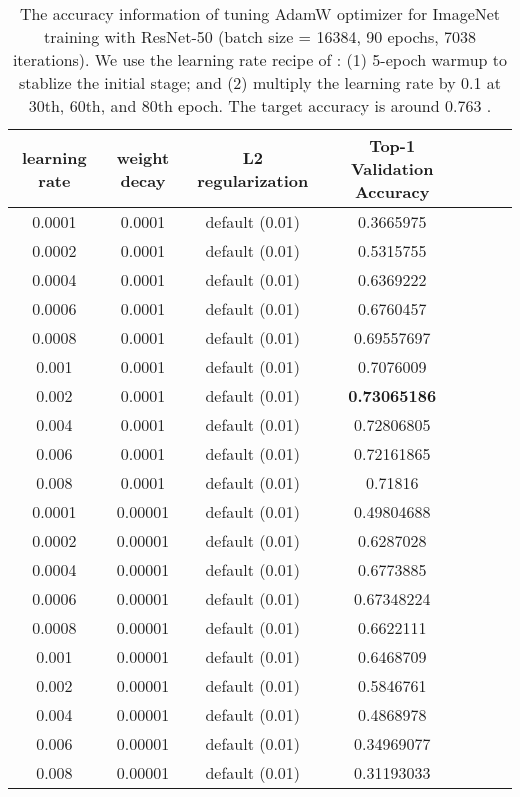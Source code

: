 \documentclass{article} \usepackage{iclr2020_conference,times}
\begin{document}
\begin{table}[ht]
\renewcommand{\arraystretch}{1.3}
\caption{The accuracy information of tuning AdamW optimizer for ImageNet training with ResNet-50 (batch size = 16384, 90 epochs, 7038 iterations). We use the learning rate recipe of \citep{goyal2017accurate}: (1) 5-epoch warmup to stablize the initial stage; and (2) multiply the learning rate by 0.1 at 30th, 60th, and 80th epoch. The target accuracy is around 0.763 \citep{goyal2017accurate}.}
\centering
\begin{tabular}{|c|c|c|c|c|c|c|}
\hline
learning rate & weight decay & L2 regularization & Top-1 Validation Accuracy \\
\hline
\hline
0.0001 & 0.0001 & default (0.01) & 0.3665975 \\
\hline
0.0002 & 0.0001 & default (0.01) & 0.5315755 \\
\hline
0.0004 & 0.0001 & default (0.01) & 0.6369222 \\
\hline
0.0006 & 0.0001 & default (0.01) & 0.6760457 \\
\hline
0.0008 & 0.0001 & default (0.01) & 0.69557697 \\
\hline
0.001 & 0.0001 & default (0.01) & 0.7076009 \\
\hline
0.002 & 0.0001 & default (0.01) & {\bf 0.73065186} \\
\hline
0.004 & 0.0001 & default (0.01) & 0.72806805 \\
\hline
0.006 & 0.0001 & default (0.01) & 0.72161865 \\
\hline
0.008 & 0.0001 & default (0.01) & 0.71816 \\
\hline
0.0001 & 0.00001 & default (0.01) & 0.49804688 \\
\hline
0.0002 & 0.00001 & default (0.01) & 0.6287028 \\
\hline
0.0004 & 0.00001 & default (0.01) & 0.6773885 \\
\hline
0.0006 & 0.00001 & default (0.01) & 0.67348224 \\
\hline
0.0008 & 0.00001 & default (0.01) & 0.6622111 \\
\hline
0.001 & 0.00001 & default (0.01) & 0.6468709 \\
\hline
0.002 & 0.00001 & default (0.01) & 0.5846761 \\
\hline
0.004 & 0.00001 & default (0.01) & 0.4868978 \\
\hline
0.006 & 0.00001 & default (0.01) & 0.34969077 \\
\hline
0.008 & 0.00001 & default (0.01) & 0.31193033 \\
\hline
\end{tabular}
\label{table:imagenet_adam_tuning_l2_2}
\end{table}
\end{document}
